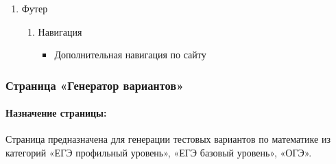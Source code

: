 \begin{enumerate}
	\item Футер
	\begin{enumerate}
		\item Навигация
		\begin{itemize}
			\item Дополнительная навигация по сайту
		\end{itemize}
	\end{enumerate}
\end{enumerate}


\subsubsection{Страница «Генератор вариантов»}
\paragraph{Назначение страницы:} Страница предназначена для генерации тестовых вариантов по математике из категорий «ЕГЭ профильный уровень», «ЕГЭ базовый уровень», «ОГЭ».

